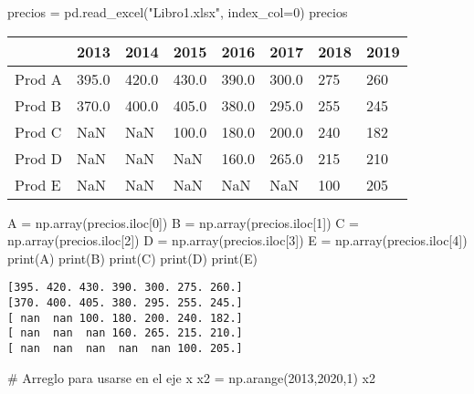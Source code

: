 \documentclass[
  letterpaper,
  DIV=11,
  numbers=noendperiod]{scrreprt}
\newenvironment{Shaded}{\begin{snugshade}}{\end{snugshade}}
\newcommand{\BuiltInTok}[1]{\textcolor[rgb]{0.00,0.23,0.31}{#1}}
\newcommand{\CommentTok}[1]{\textcolor[rgb]{0.37,0.37,0.37}{#1}}
\newcommand{\DecValTok}[1]{\textcolor[rgb]{0.68,0.00,0.00}{#1}}
\newcommand{\NormalTok}[1]{\textcolor[rgb]{0.00,0.23,0.31}{#1}}
\newcommand{\OperatorTok}[1]{\textcolor[rgb]{0.37,0.37,0.37}{#1}}
\newcommand{\StringTok}[1]{\textcolor[rgb]{0.13,0.47,0.30}{#1}}
\begin{document}
\begin{Shaded}
\begin{Highlighting}[]
\NormalTok{precios }\OperatorTok{=}\NormalTok{ pd.read\_excel(}\StringTok{"Libro1.xlsx"}\NormalTok{, index\_col}\OperatorTok{=}\DecValTok{0}\NormalTok{)}
\NormalTok{precios}
\end{Highlighting}
\end{Shaded}

\begin{longtable}[]{@{}llllllll@{}}
\toprule\noalign{}
& 2013 & 2014 & 2015 & 2016 & 2017 & 2018 & 2019 \\
\midrule\noalign{}
\endhead
\bottomrule\noalign{}
\endlastfoot
Prod A & 395.0 & 420.0 & 430.0 & 390.0 & 300.0 & 275 & 260 \\
Prod B & 370.0 & 400.0 & 405.0 & 380.0 & 295.0 & 255 & 245 \\
Prod C & NaN & NaN & 100.0 & 180.0 & 200.0 & 240 & 182 \\
Prod D & NaN & NaN & NaN & 160.0 & 265.0 & 215 & 210 \\
Prod E & NaN & NaN & NaN & NaN & NaN & 100 & 205 \\
\end{longtable}

\begin{Shaded}
\begin{Highlighting}[]
\NormalTok{A }\OperatorTok{=}\NormalTok{ np.array(precios.iloc[}\DecValTok{0}\NormalTok{])}
\NormalTok{B }\OperatorTok{=}\NormalTok{ np.array(precios.iloc[}\DecValTok{1}\NormalTok{])}
\NormalTok{C }\OperatorTok{=}\NormalTok{ np.array(precios.iloc[}\DecValTok{2}\NormalTok{])}
\NormalTok{D }\OperatorTok{=}\NormalTok{ np.array(precios.iloc[}\DecValTok{3}\NormalTok{])}
\NormalTok{E }\OperatorTok{=}\NormalTok{ np.array(precios.iloc[}\DecValTok{4}\NormalTok{])}
\BuiltInTok{print}\NormalTok{(A)}
\BuiltInTok{print}\NormalTok{(B)}
\BuiltInTok{print}\NormalTok{(C)}
\BuiltInTok{print}\NormalTok{(D)}
\BuiltInTok{print}\NormalTok{(E)}
\end{Highlighting}
\end{Shaded}

\begin{verbatim}
[395. 420. 430. 390. 300. 275. 260.]
[370. 400. 405. 380. 295. 255. 245.]
[ nan  nan 100. 180. 200. 240. 182.]
[ nan  nan  nan 160. 265. 215. 210.]
[ nan  nan  nan  nan  nan 100. 205.]
\end{verbatim}

\begin{Shaded}
\begin{Highlighting}[]
\CommentTok{\# Arreglo para usarse en el eje x}
\NormalTok{x2 }\OperatorTok{=}\NormalTok{ np.arange(}\DecValTok{2013}\NormalTok{,}\DecValTok{2020}\NormalTok{,}\DecValTok{1}\NormalTok{)}
\NormalTok{x2}
\end{Highlighting}
\end{Shaded}
\end{document}
